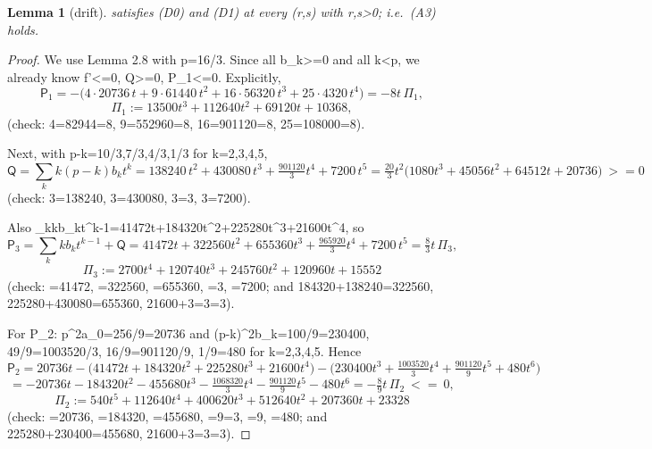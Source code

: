 \documentclass[10pt,reqno]{amsart}
\def\({}\def\){}%
\def\frac#1#2{#1/#2}%
\def\ge{>=}\def\le{<=}%
\newtheorem{lemma}[theorem]{Lemma}
\theoremstyle{definition}
\theoremstyle{remark}
\begin{document}
\begin{lemma}[drift]\label{lem:4-6}
\(\varphi\) satisfies (D0) and (D1) at every \((r,s)\) with \(r,s>0\); i.e.~(A3) holds.
\end{lemma}

\begin{proof}
We use Lemma 2.8 with \(p=\frac{16}3\). Since all \(b_k\ge0\) and all \(k<p\), we already know \(f'\le0\), \(\mathsf Q\ge0\), \(\mathsf P_1\le0\). Explicitly, \[\mathsf P_1=-\big(4\cdot20736\,t+9\cdot61440\,t^2+16\cdot56320\,t^3+25\cdot4320\,t^4\big)
=-8t\,\Pi_1,\] \[\Pi_1:=13500t^3+112640t^2+69120t+10368 ,\] (check: \(4=82944=8\), \(9=552960=8\), \(16=901120=8\), \(25=108000=8\)).

Next, with \(p-k=\frac{10}3,\frac73,\frac43,\frac13\) for \(k=2,3,4,5\), \[\mathsf Q=\sum_{k}k(p-k)b_kt^k
=138240\,t^2+430080\,t^3+\tfrac{901120}3t^4+7200\,t^5
=\tfrac{20}3t^2\big(1080t^3+45056t^2+64512t+20736\big)\ \ge0\] (check: \(3=138240\), \(3=430080\), \(3=3\), \(3=7200\)).

Also \(\sum_kkb_kt^{k-1}=41472t+184320t^2+225280t^3+21600t^4\), so \[\mathsf P_3=\sum_kkb_kt^{k-1}+\mathsf Q
=41472t+322560t^2+655360t^3+\tfrac{965920}3t^4+7200\,t^5=\tfrac83t\,\Pi_3,\] \[\Pi_3:=2700t^4+120740t^3+245760t^2+120960t+15552\] (check: \(=41472\), \(=322560\), \(=655360\), \(=3\), \(=7200\); and \(184320+138240=322560\), \(225280+430080=655360\), \(21600+3=3=3\)).

For \(\mathsf P_2\): \(p^2a_0=\frac{256}9=20736\) and \((p-k)^2b_k=\frac{100}9=230400\), \(\frac{49}9=\frac{1003520}3\), \(\frac{16}9=\frac{901120}9\), \(\frac19=480\) for \(k=2,3,4,5\). Hence \[\mathsf P_2=20736t-\big(41472t+184320t^2+225280t^3+21600t^4\big)
-\big(230400t^3+\tfrac{1003520}3t^4+\tfrac{901120}9t^5+480t^6\big)\] \[=-20736t-184320t^2-455680t^3-\tfrac{1068320}3t^4-\tfrac{901120}9t^5-480t^6
=-\tfrac89t\,\Pi_2\ \le\ 0,\] \[\Pi_2:=540t^5+112640t^4+400620t^3+512640t^2+207360t+23328\] (check: \(=20736\), \(=184320\), \(=455680\), \(=9=3\), \(=9\), \(=480\); and \(225280+230400=455680\), \(21600+3=3=3\)).


\end{proof}
\end{document}
